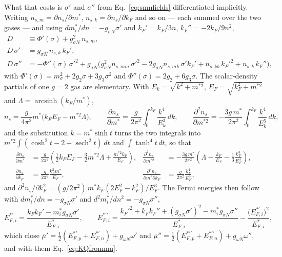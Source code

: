 \documentclass[aps,prc,onecolumn,superscriptaddress,nofootinbib,10pt]{revtex4-2}
\begin{document}
What that costs is $\sigma'$ and $\sigma''$ from
Eq.~\eqref{eq:snmfields} differentiated implicitly. Writing
$n_{s,m} = \partial n_s/\partial m^*$, $n_{s,k} = \partial n_s/\partial k_F$
and so on --- each summed over the two gases --- and using
$dm^*_i/dn = -g_{\sigma N}\sigma'$ and
$k_F' = k_F/3n$, $k_F'' = -2k_F/9n^2$,
%
\begin{align}
D &\equiv \Phi'(\sigma) + g_{\sigma N}^2\, n_{s,m} , \\
D\, \sigma' &= g_{\sigma N}\, n_{s,k}\, k_F' , \\
D\, \sigma'' &= -\Phi''(\sigma)\, \sigma'^2
  + g_{\sigma N}\Big( g_{\sigma N}^2 n_{s,mm}\, \sigma'^2
  - 2 g_{\sigma N} n_{s,mk}\, \sigma' k_F'
  + n_{s,kk}\, k_F'^2 + n_{s,k}\, k_F'' \Big) ,
\end{align}
%
with $\Phi'(\sigma) = m_\sigma^2 + 2 g_2\sigma + 3 g_3\sigma^2$ and
$\Phi''(\sigma) = 2 g_2 + 6 g_3 \sigma$. The scalar-density partials of one
$g = 2$ gas are elementary. With $E_k = \sqrt{k^2 + m^{*2}}$,
$E_F = \sqrt{k_F^2 + m^{*2}}$ and $\Lambda = \operatorname{arcsinh}(k_F/m^*)$,
%
\begin{equation}
n_s = \frac{g}{4\pi^2} m^* \big( k_F E_F - m^{*2}\Lambda \big) ,
\qquad
\frac{\partial n_s}{\partial m^*} = \frac{g}{2\pi^2}\!\int_0^{k_F}\!\!
   \frac{k^4}{E_k^3}\, dk ,
\qquad
\frac{\partial^2 n_s}{\partial m^{*2}} = -\frac{3 g\, m^*}{2\pi^2}\!
   \int_0^{k_F}\!\! \frac{k^4}{E_k^5}\, dk ,
\end{equation}
%
and the substitution $k = m^*\sinh t$ turns the two integrals into
$m^{*2}\!\int(\cosh^2 t - 2 + \operatorname{sech}^2 t)\, dt$ and
$\int \tanh^4 t\, dt$, so that
%
\begin{align}
\frac{\partial n_s}{\partial m^*} &= \frac{g}{2\pi^2}
   \left( \tfrac12 k_F E_F - \tfrac32 m^{*2}\Lambda
          + \frac{m^{*2} k_F}{E_F} \right) ,
&
\frac{\partial^2 n_s}{\partial m^{*2}} &= -\frac{3 g\, m^*}{2\pi^2}
   \left( \Lambda - \frac{k_F}{E_F}
          - \frac13 \frac{k_F^3}{E_F^3} \right) , \\
\frac{\partial n_s}{\partial k_F} &= \frac{g}{2\pi^2}\frac{k_F^2 m^*}{E_F} ,
&
\frac{\partial^2 n_s}{\partial m^* \partial k_F} &= \frac{g}{2\pi^2}
   \frac{k_F^4}{E_F^3} ,
\end{align}
%
and $\partial^2 n_s/\partial k_F^2 = (g/2\pi^2)\, m^* k_F (2E_F^2 - k_F^2)
/ E_F^3$. The Fermi energies then follow with
$dm^*_i/dn = -g_{\sigma N}\sigma'$ and
$d^2 m^*_i/dn^2 = -g_{\sigma N}\sigma''$,
%
\begin{equation}
E^{*\prime}_{F,i} = \frac{k_F k_F' - m^*_i g_{\sigma N}\sigma'}{E^*_{F,i}} ,
\qquad
E^{*\prime\prime}_{F,i} =
  \frac{k_F'^2 + k_F k_F'' + (g_{\sigma N}\sigma')^2
        - m^*_i g_{\sigma N}\sigma''}{E^*_{F,i}}
  - \frac{\big(E^{*\prime}_{F,i}\big)^2}{E^*_{F,i}} ,
\end{equation}
%
which close $\bar\mu' = \tfrac12(E^{*\prime}_{F,p} + E^{*\prime}_{F,n})
+ g_{\omega N}\omega'$ and
$\bar\mu'' = \tfrac12(E^{*\prime\prime}_{F,p} + E^{*\prime\prime}_{F,n})
+ g_{\omega N}\omega''$, and with them Eq.~\eqref{eq:KQfrommu}.
\end{document}
